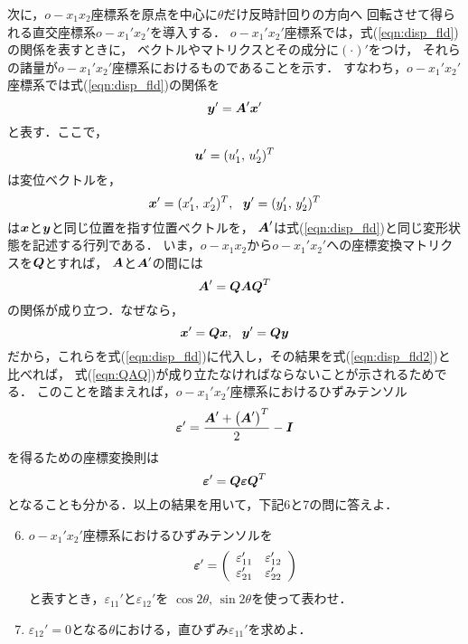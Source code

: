 \documentclass[10pt,a4j]{jarticle}
\begin{document}
次に，$o-x_1x_2$座標系を原点を中心に$\theta$だけ反時計回りの方向へ
回転させて得られる直交座標系$o-x_1'x_2'$を導入する．
$o-x_1'x_2'$座標系では，式(\ref{eqn:disp_fld})の関係を表すときに，
ベクトルやマトリクスとその成分に$(\cdot)'$をつけ，
それらの諸量が$o-x_1'x_2'$座標系におけるものであることを示す．
すなわち，$o-x_1'x_2'$座標系では式(\ref{eqn:disp_fld})の関係を
\begin{equation}
	\mbox{\boldmath $y$}'=\mbox{\boldmath $A$}'\mbox{\boldmath $x$}'
	\label{eqn:disp_fld2}
\end{equation}
と表す．ここで，
\begin{equation}
	\mbox{\boldmath $u$}'=(u_1',\, u_2')^T
\end{equation}
は変位ベクトルを，
\begin{equation}
	\mbox{\boldmath $x$}'=(x_1',\, x_2')^T, \ \ \mbox{\boldmath $y$}'=(y_1',\, y_2')^T
\end{equation}
は$\mbox{\boldmath $x$}$と$\mbox{\boldmath $y$}$と同じ位置を指す位置ベクトルを，
$\mbox{\boldmath $A$}'$は式(\ref{eqn:disp_fld})と同じ変形状態を記述する行列である．
いま，$o-x_1x_2$から$o-x_1'x_2'$への座標変換マトリクスを$\mbox{\boldmath $Q$}$とすれば，
$\mbox{\boldmath $A$}$と$\mbox{\boldmath $A$}'$の間には
\begin{equation}
	\mbox{\boldmath $A$}'=\mbox{\boldmath $Q$}\mbox{\boldmath $A$}\mbox{\boldmath $Q$}^T
	\label{eqn:QAQ}
\end{equation}
の関係が成り立つ．なぜなら，
\[
	\mbox{\boldmath $x$}'=\mbox{\boldmath $Qx$}, \ \ \mbox{\boldmath $y$}'=\mbox{\boldmath $Qy$}
\]
だから，これらを式(\ref{eqn:disp_fld})に代入し，その結果を式(\ref{eqn:disp_fld2})と比べれば，
式(\ref{eqn:QAQ})が成り立たなければならないことが示されるためでる．
このことを踏まえれば，$o-x_1'x_2'$座標系におけるひずみテンソル
\begin{equation}
	\mbox{\boldmath $\varepsilon$}'=\frac{\mbox{\boldmath $A$}'+\left(\mbox{\boldmath $A$}'\right)^T}{2}-\mbox{\boldmath $I$}
	\label{eqn:epsd_def}
\end{equation}
を得るための座標変換則は
\begin{equation}
	\mbox{\boldmath $\varepsilon$}'=\mbox{\boldmath $Q$}\mbox{\boldmath $\varepsilon$}\mbox{\boldmath $Q$}^T
	\label{eqn:QeQ}
\end{equation}
となることも分かる．以上の結果を用いて，下記6と7の問に答えよ．
\begin{enumerate}
\setcounter{enumi}{5}
\item
	$o-x_1'x_2'$座標系におけるひずみテンソルを
	\[
	\mbox{\boldmath $\varepsilon$}'
	=
	\left(
	\begin{array}{cc}
		\varepsilon_{11}' & \varepsilon_{12}' \\
		\varepsilon_{21}' & \varepsilon_{22}'
	\end{array}
	\right)
	\]
	と表すとき，$\varepsilon_{11}'$と$\varepsilon_{12}'$を
	$\cos 2\theta, \, \sin 2\theta$を使って表わせ．
\item
	$\varepsilon_{12}'=0$となる$\theta$における，直ひずみ$\varepsilon_{11}'$を求めよ．
\end{enumerate}
\end{document}
